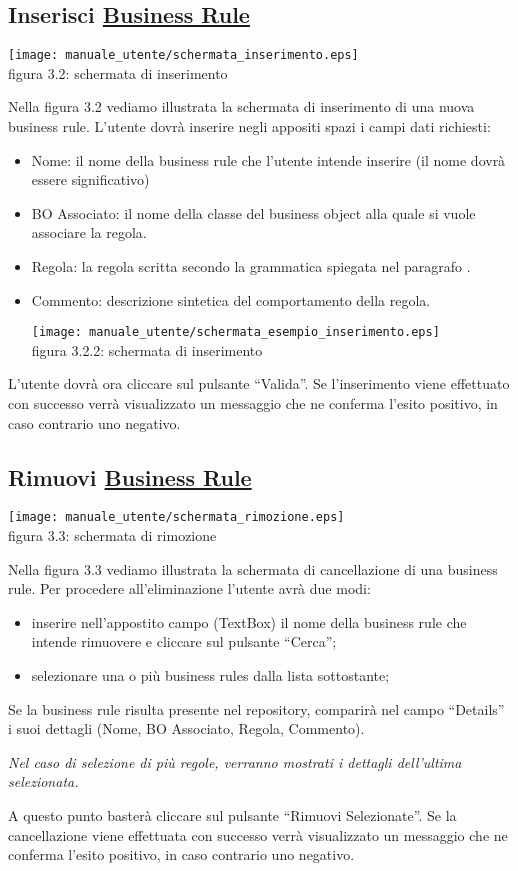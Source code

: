 \subsection{Inserisci \underline{Business Rule}}
\begin{center}
\texttt{[image: manuale\_utente/schermata\_inserimento.eps]}\\
 figura 3.2: schermata di inserimento
\end{center}
Nella figura 3.2 vediamo illustrata la schermata di inserimento di una nuova business rule. L'utente dovr\`a inserire negli appositi spazi i campi dati richiesti:
\begin{itemize}
\item Nome: il nome della business rule che l'utente intende inserire (il nome dovr\`a essere significativo)
\item BO Associato: il nome della classe del business object alla quale si vuole associare la regola.
\item Regola: la regola scritta secondo la grammatica spiegata nel paragrafo \Grammatica.
\item Commento: descrizione sintetica del comportamento della regola. 
\begin{center}
\texttt{[image: manuale\_utente/schermata\_esempio\_inserimento.eps]}\\
 figura 3.2.2: schermata di inserimento
\end{center}
\end{itemize}
L'utente dovr\`a ora cliccare sul pulsante ``Valida''. Se l'inserimento viene effettuato con successo verr\`a visualizzato un messaggio che ne conferma l'esito positivo, in caso contrario uno negativo. 
\subsection{Rimuovi \underline{Business Rule}}
\begin{center}
\texttt{[image: manuale\_utente/schermata\_rimozione.eps]}\\
 figura 3.3: schermata di rimozione
\end{center}
Nella figura 3.3 vediamo illustrata la schermata di cancellazione di una business rule. Per procedere all'eliminazione l'utente avr\`a due modi:
\begin{itemize}
\item inserire nell'appostito campo (TextBox) il nome della business rule che intende rimuovere e cliccare sul pulsante ``Cerca'';
\item selezionare una o pi\`u business rules dalla lista sottostante;
\end{itemize}
Se la business rule risulta presente nel repository, comparir\`a  nel campo ``Details'' i suoi dettagli (Nome, BO Associato, Regola, Commento). 
\begin{footnotesize}\textit{Nel caso di selezione di pi\`u regole, verranno mostrati i dettagli dell'ultima selezionata.
} \end{footnotesize} A questo punto baster\`a cliccare sul pulsante ``Rimuovi Selezionate''.  Se la cancellazione viene effettuata con successo verr\`a visualizzato un messaggio che ne conferma l'esito positivo, in caso contrario uno negativo.
